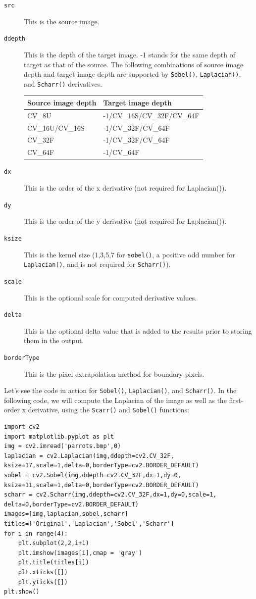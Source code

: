 \documentclass{labo}
\begin{document}
\begin{description}
	\item[\texttt{src}] This is the source image. 
	
	\item[\texttt{ddepth}] This is the depth of the target image. -1 stands for the same depth of target as that of the source. The following combinations of source image depth and target image depth are supported by \texttt{Sobel()}, \texttt{Laplacian()}, and \texttt{Scharr()} derivatives.
	\begin{center}
	\begin{tabular}{ll}\toprule
	Source image depth & Target image depth\\
	\midrule
	CV\_8U & -1/CV\_16S/CV\_32F/CV\_64F \\
	CV\_16U/CV\_16S & -1/CV\_32F/CV\_64F \\
	CV\_32F & -1/CV\_32F/CV\_64F \\
	CV\_64F & -1/CV\_64F \\
	\bottomrule
	\end{tabular}
	\end{center}
	\item[\texttt{dx}] This is the order of the x derivative (not required for Laplacian()).
	\item[\texttt{dy}] This is the order of the y derivative (not required for Laplacian()).
	\item[\texttt{ksize}] This is the kernel size (1,3,5,7 for \texttt{sobel()}, a positive odd number for \texttt{Laplacian()}, and is not required for \texttt{Scharr()}).
	\item[\texttt{scale}] This is the optional scale for computed derivative values.
	\item[\texttt{delta}] This is the optional delta value that is added to the results prior to storing them in the output.
	\item[\texttt{borderType}] This is the pixel extrapolation method for boundary pixels.
\end{description}

Let's see the code in action for \texttt{Sobel()}, \texttt{Laplacian()}, and \texttt{Scharr()}. In the following code, we will compute the Laplacian of the image as well as the first-order x derivative, using the \texttt{Scarr()} and \texttt{Sobel()} functions:

\begin{verbatim}
import cv2 
import matplotlib.pyplot as plt 
img = cv2.imread('parrots.bmp',0) 
laplacian = cv2.Laplacian(img,ddepth=cv2.CV_32F, ksize=17,scale=1,delta=0,borderType=cv2.BORDER_DEFAULT) 
sobel = cv2.Sobel(img,ddepth=cv2.CV_32F,dx=1,dy=0, ksize=11,scale=1,delta=0,borderType=cv2.BORDER_DEFAULT) 
scharr = cv2.Scharr(img,ddepth=cv2.CV_32F,dx=1,dy=0,scale=1, delta=0,borderType=cv2.BORDER_DEFAULT) 
images=[img,laplacian,sobel,scharr] 
titles=['Original','Laplacian','Sobel','Scharr'] 
for i in range(4): 
	plt.subplot(2,2,i+1) 
	plt.imshow(images[i],cmap = 'gray') 
	plt.title(titles[i])
	plt.xticks([])
	plt.yticks([]) 
plt.show()
\end{verbatim}
\end{document}
